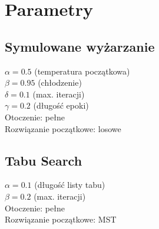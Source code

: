 \documentclass{article}
\begin{document}
\section*{Parametry}
\subsection*{Symulowane wyżarzanie}
    $\alpha = 	0.5$ 	(temperatura początkowa) \\
    $\beta = 	0.95$ 	(chłodzenie)\\
    $\delta = 	0.1$ 	(max. iteracji)\\
    $\gamma = 	0.2$ 	(długość epoki)\\
    Otoczenie: pełne\\
    Rozwiązanie początkowe: losowe\\

\subsection*{Tabu Search}
    $\alpha = 0.1$ 	(długość listy tabu)\\
    $\beta = 	0.2$ 	(max. iteracji)\\
    Otoczenie: pełne\\
    Rozwiązanie początkowe: MST\\
\end{document}
